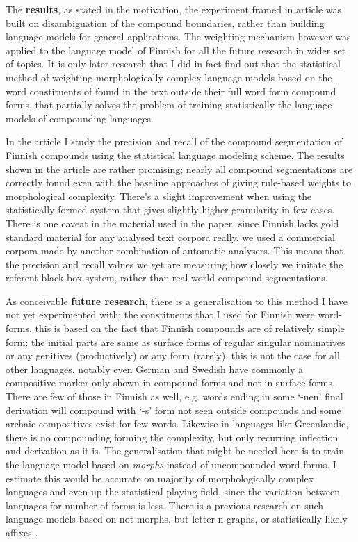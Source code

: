 \documentclass[officiallayout,draft]{unihelcompling}
\begin{document}
The \textbf{results}, as stated in the motivation, the experiment framed in
article was built on disambiguation of the compound boundaries, rather than
building language models for general applications. The weighting mechanism
however was applied to the language model of Finnish for all the future
research in wider set of topics. It is only later research that I did in fact
find out that the statistical method of weighting morphologically complex
language models based on the word constituents of found in the text outside
their full word form compound forms, that partially solves the problem of
training statistically the language models of compounding languages.

In the article I study the precision and recall of the compound segmentation
of Finnish compounds using the statistical language modeling scheme. The
results shown in the article are rather promising; nearly all compound
segmentations are correctly found even with the baseline approaches of giving
rule-based weights to morphological complexity. There's a slight improvement
when using the statistically formed system that gives slightly higher
granularity in few cases. There is one caveat in the material used in the
paper, since Finnish lacks gold standard material for any analysed text
corpora really, we used a commercial corpora made by another combination
of automatic analysers. This means that the precision and recall values we
get are measuring how closely we imitate the referent black box system, rather
than real world compound segmentations.

As conceivable \textbf{future research}, there is a generalisation to this
method I have not yet experimented with; the constituents that I used for
Finnish were word-forms, this is based on the fact that Finnish compounds are
of relatively simple form: the initial parts are same as surface forms of
regular singular nominatives or any genitives (productively) or any form
(rarely), this is not the case for all other languages, notably even German and
Swedish have commonly a compositive marker only shown in compound forms and not
in surface forms. There are few of those in Finnish as well, e.g. words ending
in some `-nen' final derivation will compound with `-s' form not seen outside
compounds and some archaic compositives exist for few words. Likewise in
languages like Greenlandic, there is no compounding forming the complexity, but
only recurring inflection and derivation as it is. The generalisation that
might be needed here is to train the language model based on \emph{morphs}
instead of uncompounded word forms. I estimate this would be accurate on
majority of morphologically complex languages and even up the statistical
playing field, since the variation between languages for number of forms is
less.  There is a previous research on such language models based
on not morphs, but letter n-graphs, or statistically likely affixes
\cite{creutz2005morfessor}.
\end{document}
